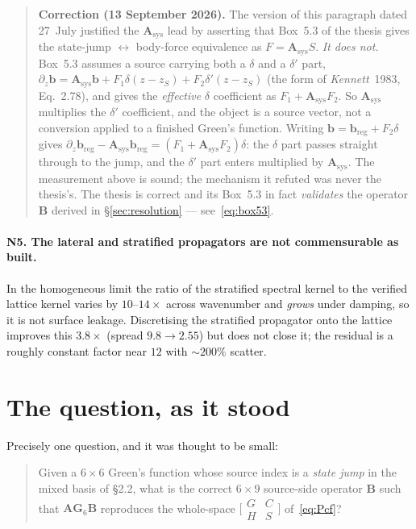 \documentclass[11pt,a4paper]{article}
\newcommand{\bA}{\mathbf{A}}
\newcommand{\bB}{\mathbf{B}}
\newcommand{\bG}{\mathbf{G}}
\newcommand{\Asys}{\mathbf{A}_{\text{sys}}}
\begin{document}
\begin{quote}\small
\textbf{Correction (13 September 2026).}  The version of this paragraph dated
27~July justified the $\Asys$ lead by asserting that Box~5.3 of the thesis
gives the state-jump $\leftrightarrow$ body-force equivalence as
$F = \Asys S$.  \emph{It does not.}  Box~5.3 assumes a source carrying both a
$\delta$ and a $\delta'$ part,
$\partial_z \mathbf{b} = \Asys\mathbf{b} + F_1\delta(z-z_S) + F_2\delta'(z-z_S)$
(the form of \emph{Kennett}~1983, Eq.~2.78), and gives the \emph{effective}
$\delta$ coefficient as $F_1 + \Asys F_2$.  So $\Asys$ multiplies the
$\delta'$ coefficient, and the object is a source vector, not a conversion
applied to a finished Green's function.  Writing
$\mathbf{b} = \mathbf{b}_{\text{reg}} + F_2\delta$ gives
$\partial_z\mathbf{b}_{\text{reg}} - \Asys\mathbf{b}_{\text{reg}}
= (F_1 + \Asys F_2)\delta$: the $\delta$ part passes straight through to the
jump, and the $\delta'$ part enters multiplied by $\Asys$.  The measurement
above is sound; the mechanism it refuted was never the thesis's.  The thesis is
correct and its Box~5.3 in fact \emph{validates} the operator $\bB$ derived in
\S\ref{sec:resolution} --- see~\eqref{eq:box53}.
\end{quote}

\paragraph{N5. The lateral and stratified propagators are not commensurable
as built.}  In the homogeneous limit the ratio of the stratified spectral
kernel to the verified lattice kernel varies by $10$--$14\times$ across
wavenumber and \emph{grows} under damping, so it is not surface leakage.
Discretising the stratified propagator onto the lattice improves this
$3.8\times$ (spread $9.8\to2.55$) but does not close it; the residual is a
roughly constant factor near $12$ with $\sim200\%$ scatter.

\section{The question, as it stood}

Precisely one question, and it was thought to be small:

\begin{quote}
Given a $6\times6$ Green's function whose source index is a \emph{state jump}
in the mixed basis of \S2.2, what is the correct $6\times9$ source-side
operator $\bB$ such that $\bA\bG_6\bB$ reproduces the whole-space
$\bigl[\begin{smallmatrix}G&C\\H&S\end{smallmatrix}\bigr]$
of~\eqref{eq:Pcf}?
\end{quote}
\end{document}
